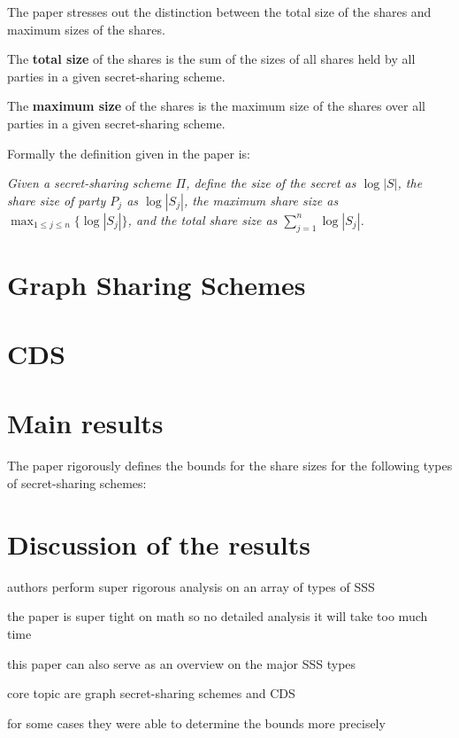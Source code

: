 The paper stresses out the distinction between the total size of the shares and maximum sizes of the shares.

The \textbf{total size} of the shares is the sum of the sizes of all shares held by all parties in a given secret-sharing scheme.

The \textbf{maximum size} of the shares is the maximum size of the shares over all parties in a given secret-sharing scheme.

Formally the definition given in the paper is:

\emph{Given a secret-sharing scheme $\Pi$,
define the \emph{size} of the secret as $\log |S|$,
the \emph{share size} of party $P_j$ as $\log |S_j|$,
the \emph{maximum share size} as $\max_{1\le j \le n} \{\log |S_j| \}$,
and the \emph{total share size} as $\sum_{j=1}^{n} \log |S_j|$.
}

\section{Graph Sharing Schemes}


\section{CDS}
\section{Main results}

The paper rigorously defines the bounds for the share sizes for the following types of secret-sharing schemes:

\section{Discussion of the results}

authors perform super rigorous analysis on an array of types of SSS

the paper is super tight on math so no detailed analysis it will take too much time

this paper can also serve as an overview on the major SSS types

core topic are graph secret-sharing schemes and CDS

for some cases they were able to determine the bounds more precisely
